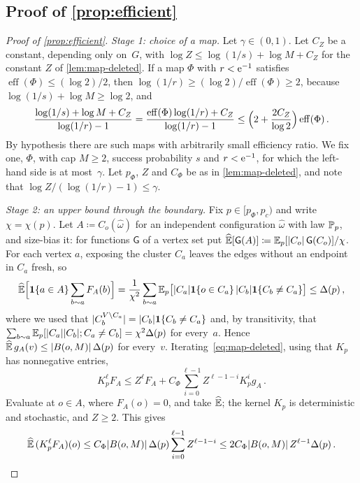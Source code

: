 \subsection{Proof of \texorpdfstring{\cref{prop:efficient}}{Proposition 3.7}}\label{sec:proof-efficient}

\begin{proof}[Proof of \cref{prop:efficient}]
\emph{Stage 1: choice of a map.} Let $\gamma\in(0,1)$. Let $C_Z$ be a constant, depending only on~$G$,
with $\log Z\le\log(1/s)+\log M+C_Z$ for the constant $Z$ of \cref{lem:map-deleted}. If a map $\Phi$
with $r<\mathrm{e}^{-1}$ satisfies $\operatorname{eff}(\Phi)\le(\log2)/2$, then
$\log(1/r)\ge(\log2)/\operatorname{eff}(\Phi)\ge2$, because $\log(1/s)+\log M\ge\log 2$, and
\begin{equation*}
  \frac{\log(1/s)+\log M+C_Z}{\log(1/r)-1}=\frac{\operatorname{eff}(\Phi)\log(1/r)+C_Z}{\log(1/r)-1}
  \le\Bigl(2+\frac{2C_Z}{\log2}\Bigr)\operatorname{eff}(\Phi)\,.
\end{equation*}
By hypothesis there are such maps with arbitrarily small efficiency ratio. We fix one, $\Phi$, with cap
$M\ge2$, success probability $s$ and $r<\mathrm{e}^{-1}$, for which the left-hand side is at most~$\gamma$. Let
$p_\Phi$, $Z$ and $C_\Phi$ be as in \cref{lem:map-deleted}, and note that $\log Z/(\log(1/r)-1)\le\gamma$.

\emph{Stage 2: an upper bound through the boundary.} Fix $p\in[p_\Phi,p_c)$ and write $\chi=\chi(p)$.
Let $A\coloneqq C_o(\hat\omega)$ for an independent configuration $\hat\omega$ with law $\mathbb P_p$, and
size-bias it: for functions $\mathsf G$ of a vertex set put
$\widehat{\mathbb E}[\mathsf G(A)]\coloneqq\mathbb E_p[\lvert C_o\rvert\,\mathsf G(C_o)]/\chi$. For each vertex $a$, exposing the
cluster $C_a$ leaves the edges without an endpoint in $C_a$ fresh, so
\begin{equation*}
  \widehat{\mathbb E}\Bigl[\mathbf{1}\{a\in A\}\sum_{b\sim a}F_A(b)\Bigr]
  =\frac1{\chi^2}\sum_{b\sim a}\mathbb E_p\bigl[\lvert C_a\rvert\mathbf{1}\{o\in C_a\}\,\lvert C_b\rvert\mathbf{1}\{C_b\neq C_a\}\bigr]
  \le\Delta(p)\,,
\end{equation*}
where we used that $\lvert C_b^{V\setminus C_a}\rvert=\lvert C_b\rvert\mathbf{1}\{C_b\neq C_a\}$ and, by transitivity, that
$\sum_{b\sim a}\mathbb E_p[\lvert C_a\rvert\lvert C_b\rvert;C_a\neq C_b]=\chi^2\Delta(p)$ for every~$a$. Hence
$\widehat{\mathbb E}\,g_A(v)\le\lvert B(o,M)\rvert\,\Delta(p)$ for every~$v$. Iterating~\eqref{eq:map-deleted}, using that
$K_p$ has nonnegative entries,
\begin{equation*}
  K_p^\ell F_A\le Z^\ell F_A+C_\Phi\sum_{i=0}^{\ell-1}Z^{\ell-1-i}K_p^ig_A\,.
\end{equation*}
Evaluate at $o\in A$, where $F_A(o)=0$, and take $\widehat{\mathbb E}$; the kernel $K_p$ is deterministic and
stochastic, and $Z\ge2$. This gives
\begin{equation}\label{eq:efficient-upper}
  \widehat{\mathbb E}\,(K_p^\ell F_A)(o)\le C_\Phi\lvert B(o,M)\rvert\,\Delta(p)\sum_{i=0}^{\ell-1}Z^{\ell-1-i}
  \le2C_\Phi\lvert B(o,M)\rvert\,Z^{\ell-1}\Delta(p)\,.
\end{equation}


\end{proof}

